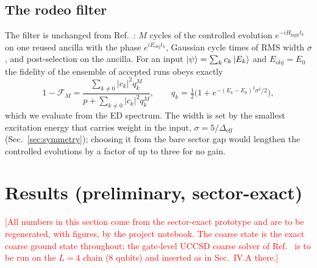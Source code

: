 \documentclass[
  aps,
  prc,
  reprint,
  superscriptaddress,
  floatfix,
  nofootinbib
]{revtex4-2}
\newcommand{\todo}[1]{\textcolor{red}{[#1]}}
\newcommand{\Hhigh}{H_{\mathrm{high}}}
\newcommand{\Eobj}{E_{\mathrm{obj}}}
\newcommand{\Deff}{\Delta_{\mathrm{eff}}}
\begin{document}
\subsection{The rodeo filter}
\label{sec:rodeo}
The filter is unchanged from Ref.~\cite{EigenQPairing2026}: $M$ cycles of
the controlled evolution $e^{-i\Hhigh t_k}$ on one reused ancilla with the
phase $e^{i\Eobj t_k}$, Gaussian cycle times of RMS width $\sigma$, and
post-selection on the ancilla.  For an input
$\ket\psi=\sum_kc_k\ket{E_k}$ and $\Eobj=E_0$ the fidelity of the ensemble
of accepted runs obeys exactly
\begin{equation}
  1-\mathcal F_M=\frac{\sum_{k\neq0}|c_k|^2q_k^M}{p+\sum_{k\neq0}|c_k|^2q_k^M},
  \qquad q_k=\tfrac12\big(1+e^{-(E_k-E_0)^2\sigma^2/2}\big),
  \label{eq:fid}
\end{equation}
which we evaluate from the ED spectrum.  The width is set by the smallest
excitation energy that carries weight in the input,
$\sigma=5/\Deff$ (Sec.~\ref{sec:symmetry}); choosing it from the bare sector
gap would lengthen the controlled evolutions by a factor of up to three for
no gain.

\section{Results (preliminary, sector-exact)}
\label{sec:results}
\todo{All numbers in this section come from the sector-exact prototype and
are to be regenerated, with figures, by the project notebook.  The coarse
state is the exact coarse ground state throughout; the gate-level UCCSD
coarse solver of Ref.~\cite{EigenQPairing2026} is to be run on the
$L=4$ chain (8 qubits) and inserted as in Sec.~IV.A there.}
\end{document}
